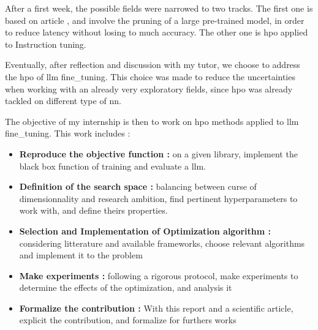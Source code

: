After a first week, the possible fields were narrowed to two tracks. The first one is based on article \cite{klein_structural_2023}, and involve the pruning of a large pre-trained model, in order to reduce latency without losing to much accuracy. The other one \cite{tribes_hyperparameter_2024} is \acrlong{hpo} applied to Instruction tuning.  

Eventually, after reflection and discussion with my tutor, we choose to address the \acrshort{hpo} of \acrshort{llm} \gls{fine_tuning}. This choice was made to reduce the uncertainties when working with an already very exploratory fields, since \acrshort{hpo} was already tackled on different type of \acrshort{nn}. 

The objective of my internship is then to work on \acrshort{hpo} methods applied to \acrshort{llm} \gls{fine_tuning}. This work includes : 
\begin{itemize}
    \item \textbf{Reproduce the objective function :} on a given library, implement the black box function of training and evaluate a \acrshort{llm}.
    \item \textbf{Definition of the search space : }balancing between curse of dimensionnality and research ambition, find pertinent \glspl{hyperparameter} to work with, and define theirs properties.
    \item \textbf{Selection and Implementation of Optimization algorithm :} considering litterature and available frameworks, choose relevant algorithms and implement it to the problem
    \item \textbf{Make experiments :} following a rigorous protocol, make experiments to determine the effects of the optimization, and analysis it
    \item \textbf{Formalize the contribution :} With this report and a scientific article, explicit the contribution, and formalize for furthers works
\end{itemize}

